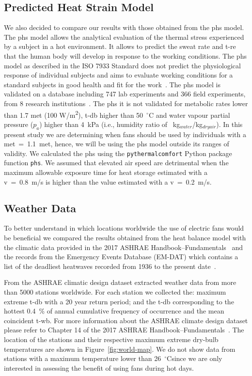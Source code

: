 \subsection{Predicted Heat Strain Model}\label{subsec:predicted-heat-strain-model}

We also decided to compare our results with those obtained from the \ac{phs} model.
The \ac{phs} model allows the analytical evaluation of the thermal stress experienced by a subject in a hot environment.
It allows to predict the sweat rate and \ac{t-re} that the human body will develop in response to the working conditions.
The \ac{phs} model as described in the ISO 7933 Standard does not predict the physiological response of individual subjects and aims to evaluate working conditions for a standard subjects in good health and fit for the work~\cite{iso7933}.
The \ac{phs} model is validated on a database including 747 lab experiments and 366 field experiments, from 8 research institutions~\cite{iso7933}.
The \ac{phs} it is not validated for metabolic rates lower than 1.7 met (100 W/m\textsuperscript{2}), \ac{t-db} higher than 50~$^{\circ}$C and water vapour partial pressure ($p_{a}$) higher than 4~kPa (i.e., humidity ratio of ~kg$_{water}$/kg$_{dry air}$).
In this present study we are determining when fans should be used by individuals with a \ac{met}~=~1.1~met, hence, we will be using the \ac{phs} model outside its ranges of validity.
We calculated the \ac{phs} using the \verb|pythermalcomfort| Python package~\cite{Tartarini2020a} function \verb|phs|.
We assumed that elevated air speed are detrimental when the maximum allowable exposure time for heat storage estimated with a \ac{v}~=~0.8~m/s is higher than the value estimated with a \ac{v}~=~0.2~m/s.

\subsection{Weather Data}\label{subsec:weather-data}

To better understand in which locations worldwide the use of electric fans would be beneficial we compared the results obtained from the heat balance model with the climatic data provided in the 2017 ASHRAE Handbook--Fundamentals~\cite{ASHRA2017} and the records from the Emergency Events Database (EM-DAT) which contains a list of the deadliest heatwaves recorded from 1936 to the present date~\cite{EMDATThe70:online}.

From the ASHRAE climatic design dataset extracted weather data from more than 5000 stations worldwide.
For each station we collected the: maximum extreme \ac{t-db} with a 20 year return period;
and the \ac{t-db} corresponding to the hottest 0.4~\% of annual cumulative frequency of occurrence and the mean coincident \ac{t-wb}.
For more information about the ASHRAE climate design dataset please refer to Chapter 14 of the 2017 ASHRAE Handbook--Fundamentals~\cite{ASHRA2017}.
The location of the stations and their respective maximum extreme dry-bulb temperatures are shown in Figure~\ref{fig:world-map}.
We do not show data from stations with a maximum temperature lower than 26~$^\circ$C\@ since we are only interested in assessing the benefit of using fans during hot days.

